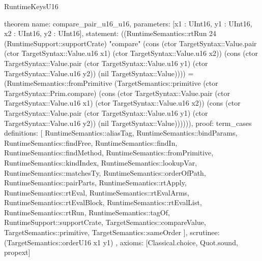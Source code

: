 \begin{lexlean}{RuntimeKeysU16}
\begin{semanticmodule}
theorem{
  name: compare_pair_u16_u16,
  parameters: [x1 : UInt16, y1 : UInt16, x2 : UInt16, y2 : UInt16],
  statement: ((RuntimeSemantics::rtRun 24 (RuntimeSupport::supportCrate) "compare" (cons (ctor TargetSyntax::Value.pair (ctor TargetSyntax::Value.u16 x1) (ctor TargetSyntax::Value.u16 x2)) (cons (ctor TargetSyntax::Value.pair (ctor TargetSyntax::Value.u16 y1) (ctor TargetSyntax::Value.u16 y2)) (nil TargetSyntax::Value)))) = (RuntimeSemantics::fromPrimitive (TargetSemantics::primitive (ctor TargetSyntax::Prim.compare) (cons (ctor TargetSyntax::Value.pair (ctor TargetSyntax::Value.u16 x1) (ctor TargetSyntax::Value.u16 x2)) (cons (ctor TargetSyntax::Value.pair (ctor TargetSyntax::Value.u16 y1) (ctor TargetSyntax::Value.u16 y2)) (nil TargetSyntax::Value)))))),
  proof: term_cases{
    definitions: [
      RuntimeSemantics::aliasTag,
      RuntimeSemantics::bindParams,
      RuntimeSemantics::findFree,
      RuntimeSemantics::findIn,
      RuntimeSemantics::findMethod,
      RuntimeSemantics::fromPrimitive,
      RuntimeSemantics::kindIndex,
      RuntimeSemantics::lookupVar,
      RuntimeSemantics::matchesTy,
      RuntimeSemantics::orderOfPath,
      RuntimeSemantics::pairParts,
      RuntimeSemantics::rtApply,
      RuntimeSemantics::rtEval,
      RuntimeSemantics::rtEvalArms,
      RuntimeSemantics::rtEvalBlock,
      RuntimeSemantics::rtEvalList,
      RuntimeSemantics::rtRun,
      RuntimeSemantics::tagOf,
      RuntimeSupport::supportCrate,
      TargetSemantics::compareValue,
      TargetSemantics::primitive,
      TargetSemantics::sameOrder
    ],
    scrutinee: (TargetSemantics::orderU16 x1 y1)
  },
  axioms: [Classical.choice, Quot.sound, propext]
}


\end{semanticmodule}
\end{lexlean}
